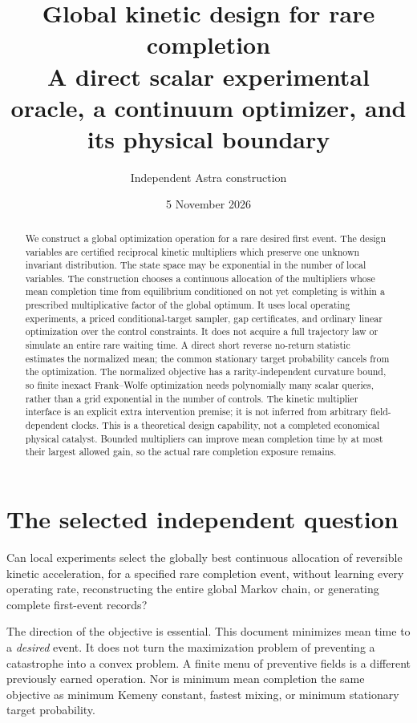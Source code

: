 \documentclass[11pt]{article}
\title{Global kinetic design for rare completion\\\large A direct scalar experimental oracle, a continuum optimizer, and its physical boundary}
\author{Independent Astra construction}
\date{5 November 2026}
\begin{document}
\maketitle
\begin{abstract}
We construct a global optimization operation for a rare desired first event.
The design variables are certified reciprocal kinetic multipliers which
preserve one unknown invariant distribution. The state space may be
exponential in the number of local variables. The construction chooses a
continuous allocation of the multipliers whose mean completion time from
equilibrium conditioned on not yet completing is within a prescribed
multiplicative factor of the global optimum. It uses local operating
experiments, a priced conditional-target sampler, gap certificates, and
ordinary linear optimization over the control constraints. It does not
acquire a full trajectory law or simulate an entire rare waiting time.
A direct short reverse no-return statistic estimates the normalized mean;
the common stationary target probability cancels from the optimization.
The normalized objective has a rarity-independent curvature bound, so
finite inexact Frank--Wolfe optimization needs polynomially many scalar
queries, rather than a grid exponential in the number of controls.
The kinetic multiplier interface is an explicit extra intervention premise;
it is not inferred from arbitrary field-dependent clocks. This is a
theoretical design capability, not a completed economical physical
catalyst. Bounded multipliers can improve mean completion time by at most
their largest allowed gain, so the actual rare completion exposure remains.
\end{abstract}

\section{The selected independent question}
Can local experiments select the globally best continuous allocation of
reversible kinetic acceleration, for a specified rare completion event,
without learning every operating rate, reconstructing the entire global
Markov chain, or generating complete first-event records?

The direction of the objective is essential. This document minimizes mean
time to a \emph{desired} event. It does not turn the maximization problem
of preventing a catastrophe into a convex problem. A finite menu of
preventive fields is a different previously earned operation. Nor is
minimum mean completion the same objective as minimum Kemeny constant,
fastest mixing, or minimum stationary target probability.
\end{document}
